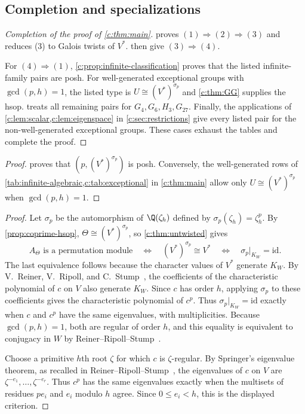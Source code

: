 \documentclass[10pt,a4paper]{amsart}
\theoremstyle{definition}
\begin{document}
\subsection{Completion and specializations}\label{c:sec:completion}

\begin{proof}[Completion of the proof of \cref{c:thm:main}]
 proves $(1)\Rightarrow(2)\Rightarrow(3)$
and reduces (3) to Galois twists of $V^*$.
then give $(3)\Rightarrow(4)$.

For $(4)\Rightarrow(1)$, \cref{c:prop:infinite-classification}
proves that the listed infinite-family pairs are posh. For well-generated
exceptional groups with $\gcd(p,h)=1$, the listed type is
$U\cong(V^*)^{\sigma_p}$ and \cref{c:thm:GG} supplies the hsop.
 treats all remaining pairs for
$G_4,G_6,H_3,G_{27}$.
Finally, the applications of \cref{c:lem:scalar,c:lem:eigenspace}
in \cref{c:sec:restrictions} give every listed pair for the
non-well-generated exceptional groups. These cases exhaust the
tables and complete the proof.
\end{proof}

\coprimeproposition*
\begin{proof}
 proves that $(p,(V^*)^{\sigma_p})$ is posh. Conversely, the
well-generated rows of \cref{tab:infinite-algebraic,c:tab:exceptional}
in \cref{c:thm:main} allow only $U\cong(V^*)^{\sigma_p}$ when
$\gcd(p,h)=1$.
\end{proof}

\begingroup
\renewcommand{\footnote}[1]{}
\coxeterpermutationcorollary*
\endgroup
\begin{proof}
Let $\sigma_p$ be the automorphism of $\Q(\zeta_h)$ defined by
$\sigma_p(\zeta_h)=\zeta_h^p$. By \cref{prop:coprime-hsop},
$\Theta\cong(V^*)^{\sigma_p}$, so \cref{c:thm:untwisted} gives
\[
 A_\Theta\text{ is a permutation module}
 \quad\Longleftrightarrow\quad
 (V^*)^{\sigma_p}\cong V^*
 \quad\Longleftrightarrow\quad
 \sigma_p|_{K_W}=\mathrm{id}.
\]
The last equivalence follows because the character values of $V^*$
generate $K_W$. By V.~Reiner, V.~Ripoll, and C.~Stump~\cite[Theorem~1.8(iv)]{RRS},
the coefficients of the characteristic polynomial of $c$ on $V$
also generate $K_W$. Since $c$ has order $h$, applying $\sigma_p$
to these coefficients gives the characteristic polynomial of $c^p$.
Thus $\sigma_p|_{K_W}=\mathrm{id}$ exactly when $c$ and $c^p$ have
the same eigenvalues, with multiplicities. Because $\gcd(p,h)=1$,
both are regular of order $h$, and this equality is equivalent to
conjugacy in $W$ by Reiner--Ripoll--Stump~\cite[Lemma~3.4 and its proof]{RRS}.

Choose a primitive $h$th root $\zeta$ for which $c$ is $\zeta$-regular.
By Springer's eigenvalue theorem, as recalled in
Reiner--Ripoll--Stump~\cite[Theorem~2.4(ii)]{RRS}, the eigenvalues of
$c$ on $V$ are $\zeta^{-e_1},\ldots,\zeta^{-e_r}$. Thus $c^p$ has the
same eigenvalues exactly when the multisets of residues $p e_i$ and
$e_i$ modulo $h$ agree. Since $0\leq e_i<h$, this is the displayed
criterion.
\end{proof}
\end{document}
